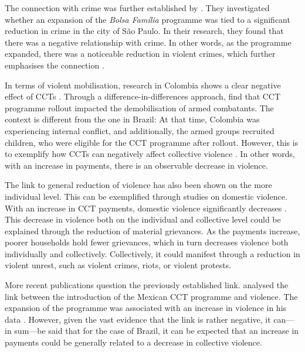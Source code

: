 \documentclass[stu,12pt]{apa7}
\begin{document}
The connection with crime was further established by \textcite{chiodaSpilloversConditionalCash2016}. They investigated whether an expansion of the \textit{Bolsa Família} programme was tied to a significant reduction in crime in the city of São Paulo. In their research, they found that there was a negative relationship with crime. In other words, as the programme expanded, there was a noticeable reduction in violent crimes, which further emphasises the connection \parencite{chiodaSpilloversConditionalCash2016}.

In terms of violent mobilisation, research in Colombia shows a clear negative effect of CCTs \parencite{penaCivilConflictConditional2017}. Through a difference-in-differences approach, \textcite{penaCivilConflictConditional2017} find that CCT programme rollout impacted the demobilisation of armed combatants. The context is different from the one in Brazil: At that time, Colombia was experiencing internal conflict, and additionally, the armed groups recruited children, who were eligible for the CCT programme after rollout. However, this is to exemplify how CCTs can negatively affect collective violence \parencite{penaCivilConflictConditional2017}. In other words, with an increase in payments, there is an observable decrease in violence.

The link to general reduction of violence has also been shown on the more individual level. This can be exemplified through studies on domestic violence. With an increase in CCT payments, domestic violence significantly decreases \parencite{litwinConditionalCashTransfer2019, borrazConditionalCashTransfers2020}. This decrease in violence both on the individual and collective level could be explained through the reduction of material grievances. As the payments increase, poorer households hold fewer grievances, which in turn decreases violence both individually and collectively. Collectively, it could manifest through a reduction in violent unrest, such as violent crimes, riots, or violent protests.

More recent publications question the previously established link. \textcite{zizumbo-colungaUnintendedConsequencesConditional2023} analysed the link between the introduction of the Mexican CCT programme and violence. The expansion of the programme was associated with an increase in violence in his data \parencite{zizumbo-colungaUnintendedConsequencesConditional2023}. However, given the vast evidence that the link is rather negative, it can—in sum—be said that for the case of Brazil, it can be expected that an increase in payments could be generally related to a decrease in collective violence.
\end{document}
